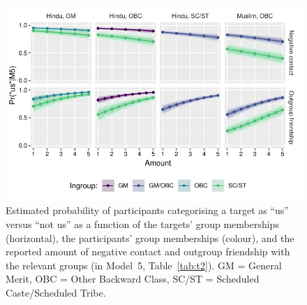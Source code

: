 \documentclass[12pt, a4paper]{article}
\begin{document}
\begin{figure}
\centering
\includegraphics[scale=1]{../figures/figure-4}
\caption{Estimated probability of participants categorising a target as ``us'' versus ``not us'' as a function of the targets' group memberships (horizontal), the participants' group memberships (colour), and the reported amount of negative contact and outgroup friendship with the relevant groups (in Model~5, Table~\ref{tab:t2}). GM = General Merit, OBC = Other Backward Class, SC/ST = Scheduled Caste/Scheduled Tribe.}
\label{fig:f4}
\end{figure}
\end{document}
